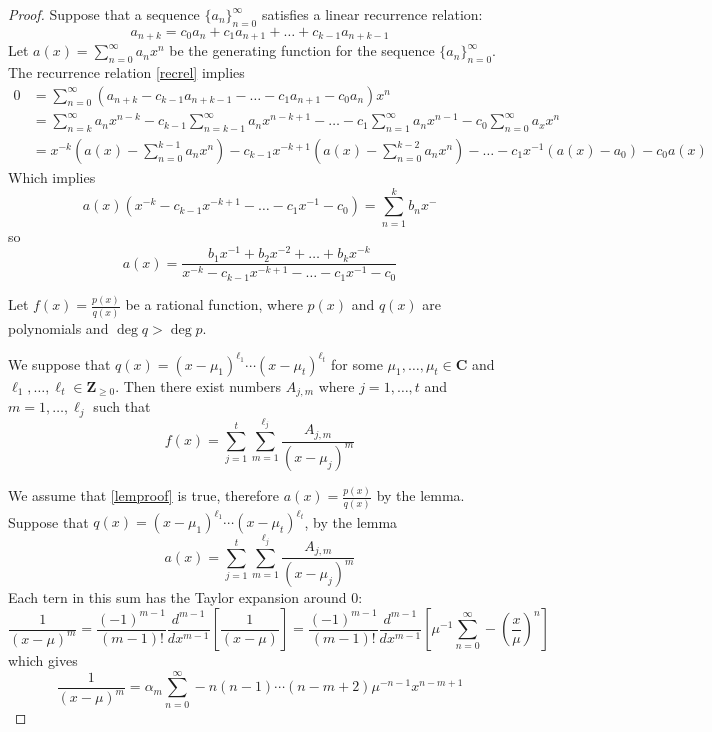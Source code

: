 \begin{proof}
Suppose that a sequence $\{ a_{n} \}_{n=0}^{\infty}$ satisfies a linear recurrence relation:
\begin{equation}
a_{n+k}=c_{0}a_{n}+c_{1}a_{n+1}+\dots +c_{k-1}a_{n+k-1}    \label{recrel}
\end{equation}
Let $a(x)=\sum_{n=0}^{\infty}a_{n}x^{n}$ be the generating function for the sequence $\{ a_{n} \}_{n=0}^{\infty}$. The recurrence relation \ref{recrel} implies 
\begin{align*}
0 & =\sum_{n=0}^{\infty} (a_{n+k}-c_{k-1}a_{n+k-1}-\dots-c_{1}a_{n+1}-c_{0}a_{n})x^{n} \\
 & =\sum_{n=k}^{\infty} a_{n}x^{n-k}-c_{k-1}\sum_{n=k-1}^{\infty} a_{n}x^{n-k+1}-\dots-c_{1}\sum_{n=1}^{\infty} a_{n}x^{n-1}-c_{0}\sum_{n=0}^{\infty} a_{x}x^{n} \\
 & = x^{-k}\left( a(x)-\sum_{n=0}^{k-1} a_{n}x^{n} \right)-c_{k-1}x^{-k+1 }\left( a(x)-\sum_{n=0}^{k-2} a_{n}x^{n}  \right)-\dots-c_{1}x ^{-1}(a(x)-a_{0})-c_{0}a(x)
\end{align*}
Which implies
$$
a(x)(x^{-k}-c_{k-1}x^{-k+1}-\dots -c_{1}x ^{-1}-c_{0})=\sum_{n=1}^{k} b_{n}x^{-}
$$
so
$$
a(x)=\frac{b_{1}x ^{-1} +b_{2}x^{-2}+\dots +b_{k}x^{-k}}{x^{-k}-c_{k-1}x^{-k+1}-\dots -c_{1}x ^{-1}-c_{0}}
$$
\begin{lemma} \label{lemproof}
Let $f(x)=\frac{p(x)}{q(x)}$ be a rational function, where $p(x)$ and $q(x)$ are polynomials and $\deg q > \deg p$.

We suppose that $q(x)=(x-\mu_{1})^{\ell_{1}}\cdots(x-\mu_{t})^{\ell _{t}}$ for some $\mu_{1},\dots,\mu _{t}\in \mathbf{C}$ and $\ell_{1},\dots,\ell _{t}\in \mathbf{Z}_{\ge 0}$. Then there exist numbers $A_{j,m}$ where $j=1,\dots,t$ and $m=1,\dots,\ell _{j}$ such that
$$
f(x)=\sum_{j=1}^{t} \sum_{m=1}^{\ell _{j}}  \frac{A_{j,m}}{(x-\mu _{j})^{m}}
$$
\end{lemma}
We assume that \ref{lemproof} is true, therefore $a(x)=\frac{p(x)}{q(x)}$ by the lemma. Suppose that $q(x)=(x-\mu_{1})^{\ell _{1}}\cdots(x-\mu _{t})^{\ell _{t}}$, by the lemma
$$
a(x)=\sum_{j=1}^{t} \sum_{m=1}^{\ell _{j}}  \frac{A_{j,m}}{(x-\mu _{j})^{m}}
$$
Each tern in this sum has the Taylor expansion around 0:
$$
\frac{1}{(x-\mu)^{m}}=\frac{(-1)^{m-1}}{(m-1)!} \frac{d^{m-1}}{dx^{m-1}}\left[ \frac{1}{(x-\mu)} \right]= \frac{(-1)^{m-1}}{(m-1)!} \frac{d^{m-1}}{dx^{m-1}}\left[ \mu ^{-1}\sum_{n=0}^{\infty} -\left( \frac{x}{\mu} \right)^{n}  \right]
$$
which gives
$$
\frac{1}{(x-\mu)^{m}}=\alpha _{m}\sum_{n=0}^{\infty} -n(n-1)\cdots(n-m+2)\mu^{-n-1}x^{n-m+1}
$$


\end{proof}
